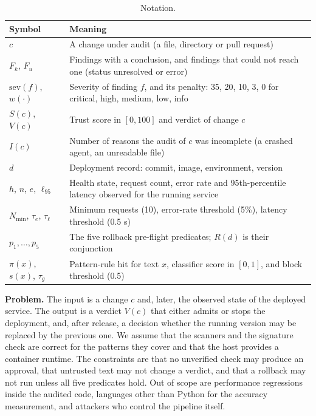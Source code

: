 \documentclass[12pt,onecolumn,draftclsnofoot]{IEEEtran}
\begin{document}
\begin{table}[htbp]\centering
\caption{Notation.}
\label{tab:notation}\small
\begin{tabular}{@{}p{.12\linewidth}p{.78\linewidth}@{}}\toprule
Symbol & Meaning\\\midrule
$c$ & A change under audit (a file, directory or pull request)\\
$F_k$, $F_u$ & Findings with a conclusion, and findings that could not reach one (status unresolved or error)\\
$\mathrm{sev}(f)$, $w(\cdot)$ & Severity of finding $f$, and its penalty: 35, 20, 10, 3, 0 for critical, high, medium, low, info\\
$S(c)$, $V(c)$ & Trust score in $[0,100]$ and verdict of change $c$\\
$I(c)$ & Number of reasons the audit of $c$ was incomplete (a crashed agent, an unreadable file)\\
$d$ & Deployment record: commit, image, environment, version\\
$h$, $n$, $e$, $\ell_{95}$ & Health state, request count, error rate and 95th-percentile latency observed for the running service\\
$N_{\min}$, $\tau_e$, $\tau_\ell$ & Minimum requests (10), error-rate threshold (5\%), latency threshold (0.5 s)\\
$p_1,\dots,p_5$ & The five rollback pre-flight predicates; $R(d)$ is their conjunction\\
$\pi(x)$, $s(x)$, $\tau_g$ & Pattern-rule hit for text $x$, classifier score in $[0,1]$, and block threshold (0.5)\\
\bottomrule\end{tabular}
\end{table}

\textbf{Problem.} The input is a change $c$ and, later, the observed state of the deployed service. The output is a verdict $V(c)$ that either admits or stops the deployment, and, after release, a decision whether the running version may be replaced by the previous one. We assume that the scanners and the signature check are correct for the patterns they cover and that the host provides a container runtime. The constraints are that no unverified check may produce an approval, that untrusted text may not change a verdict, and that a rollback may not run unless all five predicates hold. Out of scope are performance regressions inside the audited code, languages other than Python for the accuracy measurement, and attackers who control the pipeline itself.
\end{document}
